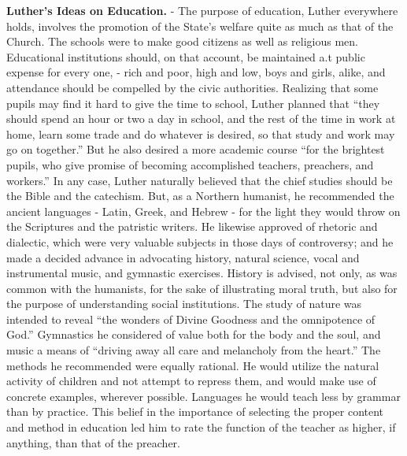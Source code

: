 \documentclass[]{book}
\begin{document}
\textbf{Luther's Ideas on Education.} - The purpose of education, Luther everywhere holds, involves the promotion of the State's welfare quite as much as that of the Church. The schools were to make good citizens as well as religious men. Educational institutions should, on that account, be maintained a.t public expense for every one, - rich and poor, high and low, boys and girls, alike, and attendance should be compelled by the civic authorities. Realizing that some pupils may find it hard to give the time to school, Luther planned that ``they should spend an hour or two a day in school, and the rest of the time in work at home, learn some trade and do whatever is desired, so that study and work may go on together.'' But he also desired a more academic course ``for the brightest pupils, who give promise of becoming accomplished teachers, preachers, and workers.'' In any case, Luther naturally believed that the chief studies should be the Bible and the catechism. But, as a Northern humanist, he recommended the ancient languages - Latin, Greek, and Hebrew - for the light they would throw on the Scriptures and the patristic writers. He likewise approved of rhetoric and dialectic, which were very valuable subjects in those days of controversy; and he made a decided advance in advocating history, natural science, vocal and instrumental music, and gymnastic exercises. History is advised, not only, as was common with the humanists, for the sake of illustrating moral truth, but also for the purpose of understanding social institutions. The study of nature was intended to reveal ``the wonders of Divine Goodness and the omnipotence of God.'' Gymnastics he considered of value both for the body and the soul, and music a means of ``driving away all care and melancholy from the heart.'' The methods he recommended were equally rational. He would utilize the natural activity of children and not attempt to repress them, and would make use of concrete examples, wherever possible. Languages he would teach less by grammar than by practice. This belief in the importance of selecting the proper content and method in education led him to rate the function of the teacher as higher, if anything, than that of the preacher.
\end{document}
